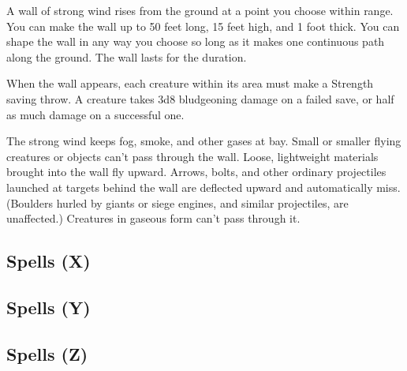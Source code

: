 A wall of strong wind rises from the ground at a point you choose within range. You can make the wall up to 50 feet long, 15 feet high, and 1 foot thick. You can shape the wall in any way you choose so long as it makes one continuous path along the ground. The wall lasts for the duration.

When the wall appears, each creature within its area must make a Strength saving throw. A creature takes 3d8 bludgeoning damage on a failed save, or half as much damage on a successful one.

The strong wind keeps fog, smoke, and other gases at bay. Small or smaller flying creatures or objects can't pass through the wall. Loose, lightweight materials brought into the wall fly upward. Arrows, bolts, and other ordinary projectiles launched at targets behind the wall are deflected upward and automatically miss. (Boulders hurled by giants or siege engines, and similar projectiles, are unaffected.) Creatures in gaseous form can't pass through it.

\subsection{Spells (X)}

\subsection{Spells (Y)}

\subsection{Spells (Z)}